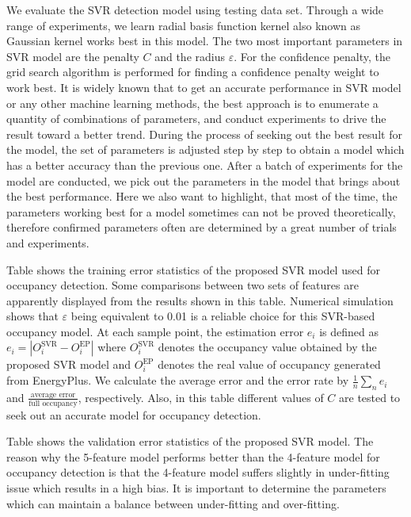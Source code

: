 We evaluate the SVR detection model using
testing data set. Through a wide range of experiments, we learn radial
basis function kernel also known as Gaussian kernel works best in this
model. \textcolor{feb18rev}{The two most important parameters in SVR model 
are the penalty $C$ and the radius $\varepsilon$. For the confidence penalty,
the grid search algorithm \cite{Hsu2003} is performed for finding a confidence
penalty weight to work best.}
It is widely known that to get an accurate performance in SVR model or any other machine
learning methods, the best approach is to enumerate a quantity of
combinations of parameters, and conduct experiments to drive the
result toward a better trend. During the process of seeking out the
best result for the model, the set of parameters is adjusted step by
step to obtain a model which has a better accuracy than the previous
one. After a batch of experiments for the model are conducted, we pick
out the parameters in the model that brings about the best
performance. Here we also want to highlight, that most of the time,
the parameters working best for a model sometimes can not be proved
theoretically, therefore confirmed parameters often are determined by
a great number of trials and experiments.

Table  shows the training error statistics of the proposed SVR
model used for occupancy detection. Some comparisons between two sets
of features are apparently displayed from the results shown in this
table. Numerical simulation shows that $\varepsilon$ being equivalent
to 0.01 is a reliable choice for this SVR-based occupancy model. At
each sample point, the estimation error ${e_i}$ is defined as
${e_i} = \left| {O_i^{\textrm{SVR}} - O_i^{\textrm{EP}}} \right|$ where $O_i^{\textrm{SVR}}$
denotes the occupancy value obtained by the proposed SVR model and
$O_i^{\textrm{EP}}$ denotes the real value of occupancy generated from EnergyPlus. We calculate the average error and the error rate by
$\frac{1}{n}\sum\nolimits_n {{e_i}}$ and
$\frac{\text{average error}}{\text{full occupancy}}$,
respectively. Also, in this table different values of $C$ are tested
to seek out an accurate model for occupancy detection.

Table  shows the validation error statistics of the proposed SVR model.
The reason why the 5-feature model performs better than the 4-feature
model for occupancy detection is that the 4-feature model suffers slightly in
under-fitting issue which results in a high bias. It is important to determine
the parameters which can maintain a balance between under-fitting and
over-fitting.


